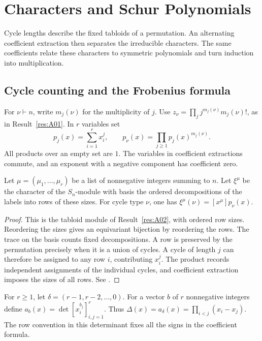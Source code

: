 \chapter[Characters and Schur polynomials]{Characters and Schur Polynomials}

Cycle lengths describe the fixed tabloids of a permutation. An
alternating coefficient extraction then separates the irreducible
characters. The same coefficients relate these characters to symmetric
polynomials and turn induction into multiplication.

\section{Cycle counting and the Frobenius formula}

For \(\nu\vdash n\), write \(m_j(\nu)\) for the multiplicity of \(j\).
Use \(z_\nu=\prod_j j^{m_j(\nu)}m_j(\nu)!\), as in
Result~\ref{res:A01}. In \(r\) variables set
\[
 p_j(x)=\sum_{i=1}^r x_i^j,\qquad
 p_\nu(x)=\prod_{j\ge1}p_j(x)^{m_j(\nu)}.
\]
All products over an empty set are \(1\). The variables in coefficient
extractions commute, and an exponent with a negative component has
coefficient zero.

\begin{proposition}\label{res:C01}
Let \(\mu=(\mu_1,\ldots,\mu_r)\) be a list of nonnegative integers summing
to \(n\). Let \(\xi^\mu\) be the character of the \(S_n\)-module with
basis the ordered decompositions of the labels into rows of these sizes.
For cycle type \(\nu\), one has \(\xi^\mu(\nu)=[x^\mu]p_\nu(x)\).
\end{proposition}

\begin{proof}
This is the tabloid module of Result~\ref{res:A02}, with ordered row
sizes. Reordering the sizes gives an equivariant bijection by
reordering the rows. The trace on the basis counts fixed decompositions.
A row is preserved by the permutation precisely when it is a union of
cycles. A cycle of length \(j\) can therefore be assigned to any row
\(i\), contributing \(x_i^j\). The product records independent assignments
of the individual cycles, and coefficient extraction imposes the sizes
of all rows. See \cite[Section 4.14]{etingof}.
\end{proof}

For \(r\ge1\), let \(\delta=(r-1,r-2,\ldots,0)\). For a vector \(b\)
of \(r\) nonnegative integers define \(a_b(x)=\det[x_i^{b_j}]_{i,j=1}^r\).
Thus \(\Delta(x)=a_\delta(x)=\prod_{i<j}(x_i-x_j)\). The row convention
in this determinant fixes all the signs in the coefficient formula.

